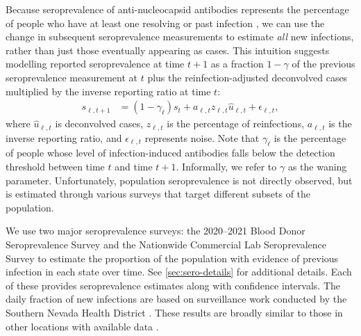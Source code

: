 Because seroprevalence of anti-nucleocapsid antibodies represents the percentage
of people who have at least one resolving or past infection \citep{cdc2020data},
we can use the change in subsequent seroprevalence measurements to estimate
\emph{all} new infections, rather than just those eventually appearing as cases.
This intuition suggests modelling reported seroprevalence at time $t+1$ as a
fraction $1-\gamma$ of the previous seroprevalence measurement at $t$ plus the
reinfection-adjusted deconvolved cases multiplied by
the inverse reporting ratio at time $t$:
\begin{align}
s_{\ell,t+1} & = (1 -\gamma_{\ell}) s_t 
+ a_{\ell,t} z_{\ell,t} \widehat{u}_{\ell,t} + \epsilon_{\ell,t},
\end{align}
where $\widehat{u}_{\ell,t}$ is deconvolved cases,
$z_{\ell,t}$ is the percentage of reinfections, $a_{\ell,t}$ is the inverse
reporting ratio, and $\epsilon_{\ell,t}$ represents noise. Note that
$\gamma_{\ell}$ is the percentage of people whose level of infection-induced
antibodies falls below the detection threshold between time $t$ and time
$t+1$. Informally, we refer to $\gamma$ as the waning parameter. Unfortunately,
population seroprevalence is not directly observed, but is estimated through
various surveys that target different subsets of the population.

We use two major seroprevalence
surveys: the 2020--2021 Blood Donor Seroprevalence Survey and the Nationwide
Commercial Lab Seroprevalence Survey \citep{cdc2021blood, cdc2021comm}
to estimate the proportion of the population with
evidence of previous infection in each state over time. See
\autoref{sec:sero-details} for additional details. Each of these provides
seroprevalence estimates along with confidence intervals.
The daily fraction of new infections are based on surveillance work conducted by
the Southern Nevada Health District \citep{ruff2022rapid}. These results
are broadly similar to those in other locations with available data  \citep{ruff2022rapid, nyreinfect2021, hireinfect2022, wareinfect2022}.


